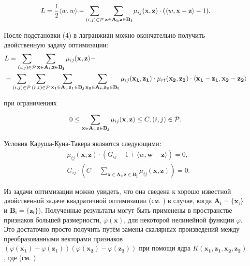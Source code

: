 \documentclass[12pt,a4paper,oneside]{article}
\begin{document}
\[
L = \frac{1}{2} \langle w, w \rangle - \sum \limits_{(i, j) \in \mathcal{P}} \sum \limits_{\mathbf{x} \in \mathbf{A_i}, \mathbf{z} \in \mathbf{B_j}} \mu_{ij} (\mathbf{x}, \mathbf{z}) \cdot (\langle w, \mathbf{x} - \mathbf{z} \rangle - 1).
\]

\par
После подстановки (4) в лагранжиан можно окончательно получить двойственную задачу оптимизации:
\mbox{}
\begin{eqnarray*}
&L = \sum \limits_{(i, j) \in \mathcal{P}} \sum \limits_{\mathbf{x} \in \mathbf{A_i}, \mathbf{z} \in \mathbf{B_j}} \mu_{ij} (\mathbf{x}, \mathbf{z}) - \\
&- \sum \limits_{(i, j) \in \mathcal{P}} \sum \limits_{(r, t) \in \mathcal{P}} \sum \limits_{\mathbf{x_1} \in \mathbf{A_i}, \mathbf{z_1} \in \mathbf{B_j}} \sum \limits_{\mathbf{x_2} \in \mathbf{A_r}, \mathbf{z_2} \in \mathbf{B_t}} \mu_{ij} (\mathbf{x_1}, \mathbf{z_1}) \cdot \mu_{rt} (\mathbf{x_2}, \mathbf{z_2}) \cdot \langle \mathbf{x_1} - \mathbf{z_1}, \mathbf{x_2} - \mathbf{z_2} \rangle
\end{eqnarray*}

\par
при ограничениях

\[
0 \leq \sum \limits_{\mathbf{x} \in \mathbf{A_i}, \mathbf{z} \in \mathbf{B_j}} \mu_{ij} (\mathbf{x}, \mathbf{z}) \leq C, (i, j) \in \mathcal{P}.
\]

\par
Условия Каруша-Куна-Такера являются следующими:
\mbox{}
\begin{eqnarray*}
&\mu_{ij}(\mathbf{x}, \mathbf{z}) \cdot (G_{ij} - 1 + \langle w, \mathbf{w} - \mathbf{z} \rangle) = 0,\\
&G_{ij} \cdot (C - \sum \limits_{\mathbf{x} \in \mathbf{A_i}, \mathbf{z} \in \mathbf{B_j}} \mu_{ij} (\mathbf{x}, \mathbf{z})) = 0.
\end{eqnarray*}

\par
Из задачи оптимизации можно увидеть, что она сведена к хорошо известной двойственной задаче квадратичной оптимизации (см. ) в случае, когда \(\mathbf{A_i} = \{\mathbf{x_i}\}\) и \(\mathbf{B_i} = \{\mathbf{z_i}\}\)). 
Полученные результаты могут быть применены в пространстве признаков большей размерности, \(\varphi(\mathbf{x})\), для некоторой нелинейной функции \(\varphi\). 
Это достаточно просто получить путём замены скалярных произведений между преобразованными векторами признаков \((\varphi(\mathbf{x_1}) - \varphi(\mathbf{z_1})) (\varphi(\mathbf{x_2}) - \varphi(\mathbf{z_2}))\) при помощи ядра \(K(\mathbf{x_1}, \mathbf{z_1}, \mathbf{x_2}, \mathbf{z_2})\), где (см. )
\end{document}
